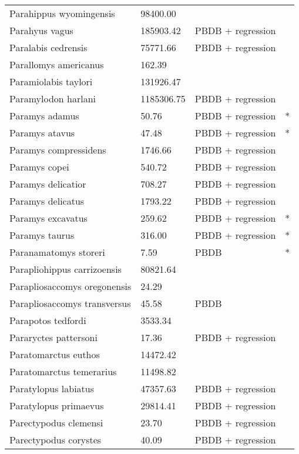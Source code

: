 \documentclass{article}
\begin{document}
\begin{center}
\begin{longtable}{p{} p{} p{} p{}}
    Parahippus wyomingensis & 98400.00 & \cite{MacFadden1986} &  \\ 
    Parahyus vagus & 185903.42 & PBDB + regression &  \\ 
    Paralabis cedrensis & 75771.66 & PBDB + regression &  \\ 
    Parallomys americanus & 162.39 & \cite{Tomiya2013} &  \\ 
    Paramiolabis taylori & 131926.47 & \cite{Tomiya2013} &  \\ 
    Paramylodon harlani & 1185306.75 & PBDB + regression &  \\ 
    Paramys adamus & 50.76 & PBDB + regression & * \\ 
    Paramys atavus & 47.48 & PBDB + regression & * \\ 
    Paramys compressidens & 1746.66 & PBDB + regression &  \\ 
    Paramys copei & 540.72 & PBDB + regression &  \\ 
    Paramys delicatior & 708.27 & PBDB + regression &  \\ 
    Paramys delicatus & 1793.22 & PBDB + regression &  \\ 
    Paramys excavatus & 259.62 & PBDB + regression & * \\ 
    Paramys taurus & 316.00 & PBDB + regression & * \\ 
    Paranamatomys storeri & 7.59 & PBDB & * \\ 
    Parapliohippus carrizoensis & 80821.64 & \cite{Tomiya2013} &  \\ 
    Parapliosaccomys oregonensis & 24.29 & \cite{Tomiya2013} &  \\ 
    Parapliosaccomys transversus & 45.58 & PBDB &  \\ 
    Parapotos tedfordi & 3533.34 & \cite{Tomiya2013} &  \\ 
    Pararyctes pattersoni & 17.36 & PBDB + regression &  \\ 
    Paratomarctus euthos & 14472.42 & \cite{Tomiya2013} &  \\ 
    Paratomarctus temerarius & 11498.82 & \cite{Tomiya2013} &  \\ 
    Paratylopus labiatus & 47357.63 & PBDB + regression &  \\ 
    Paratylopus primaevus & 29814.41 & PBDB + regression &  \\ 
    Parectypodus clemensi & 23.70 & PBDB + regression &  \\ 
    Parectypodus corystes & 40.09 & PBDB + regression &  \\ 

\end{longtable}
\end{center}
\end{document}
